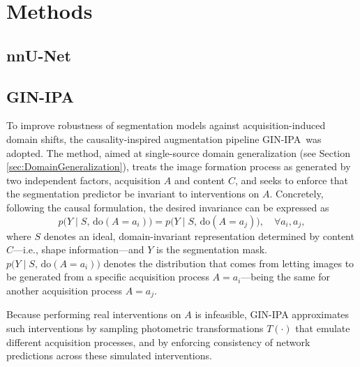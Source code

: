 \chapter{Methods} \label{chap:Methods}
\vspace{1cm}


\section{nnU-Net}


\section{GIN-IPA} \label{sec:gin-ipa}
To improve robustness of segmentation models against acquisition-induced domain shifts, the causality-inspired augmentation pipeline GIN-IPA\,\cite{Ouyang2023} was adopted. The method, aimed at single-source domain generalization (see Section \ref{sec:DomainGeneralization}), treats the image formation process as generated by two independent factors, acquisition $A$ and content $C$, and seeks to enforce that the segmentation predictor be invariant to interventions on $A$. Concretely, following the causal formulation, the desired invariance can be expressed as
\begin{equation}\label{eq:domain-inv}
    p\bigl(Y\mid S,\,\mathrm{do}(A= a_i)\bigr) 
    = p\bigl(Y\mid S,\,\mathrm{do}(A= a_j)\bigr), \quad \forall a_i,a_j,
\end{equation}
where $S$ denotes an ideal, domain-invariant representation determined by content $C$---i.e., shape information---and $Y$ is the segmentation mask. $p\bigl(Y\mid S,\,\mathrm{do}(A= a_i)\bigr)$ denotes the distribution that comes from letting images to be generated from a specific acquisition process $A = a_i$---being the same for another acquisition process $A = a_j$.

Because performing real interventions on $A$ is infeasible, GIN-IPA approximates such interventions by sampling photometric transformations $T(\cdot)$ that emulate different acquisition processes, and by enforcing consistency of network predictions across these simulated interventions.

